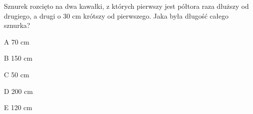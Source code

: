 \begin{tresc}
Sznurek rozcięto na dwa kawałki, z których pierwszy jest półtora raza dłuższy od drugiego, a drugi o 30 cm krótszy od pierwszego. Jaka była długość całego sznurka?
\end{tresc}
\begin{wariant}{A} 70 cm \end{wariant}
\begin{wariant}{B} 150 cm \end{wariant}
\begin{wariant}{C} 50 cm \end{wariant}
\begin{wariant}{D} 200 cm \end{wariant}
\begin{wariant}{E} 120 cm \end{wariant}
